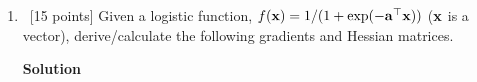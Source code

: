 \documentclass[12pt, fullpage,letterpaper]{article}
\newcommand{\solution}{\textbf{\large Solution}}
\begin{document}
\begin{enumerate}
\begin{enumerate}
\solution

Using the definition of expected value:

\[
	\begin{split}
		\EE(\VV(Y|X)) = \EE(\EE(Y^2|X)) - \EE((\EE(Y|X))^2)
	\end{split}
\]

But, from part (a), we can say the following:

$$ \EE(\EE(Y^2|X)) = \EE(Y^2) $$

Therefore:
\[
	\begin{split}
		\EE(\VV(Y|X)) = \EE(Y^2) - \EE((\EE(Y|X))^2)
	\end{split}
\]

Using the other formula for variance, we have: 
\[
	\begin{split}
		\VV(\EE(Y|X)) &= \EE(\EE(Y|X)^2) - (\EE(\EE(Y|X))^2
			\\
			&= \EE(\EE(Y|X)^2) - (\EE(Y))^2
	\end{split}
\]

Combining the two equations above gives the wanted result:
\[
	\begin{split}
		\EE(\VV(Y|X)) + \VV(\EE(Y|X)) &= \EE(Y^2) - (\EE(Y))^2
			\\
			&= \VV(Y)
	\end{split}
\]


\end{enumerate}


\pagebreak
\label{sec:q7}
\item~[15 points] Given a logistic function, $f({\bf x}) = 1/(1+\exp(-{\bf a}^\top {\bf x}))$ (${\bf x}$ is a vector), derive/calculate the following gradients and Hessian matrices.  

\solution


\end{enumerate}
\end{document}

